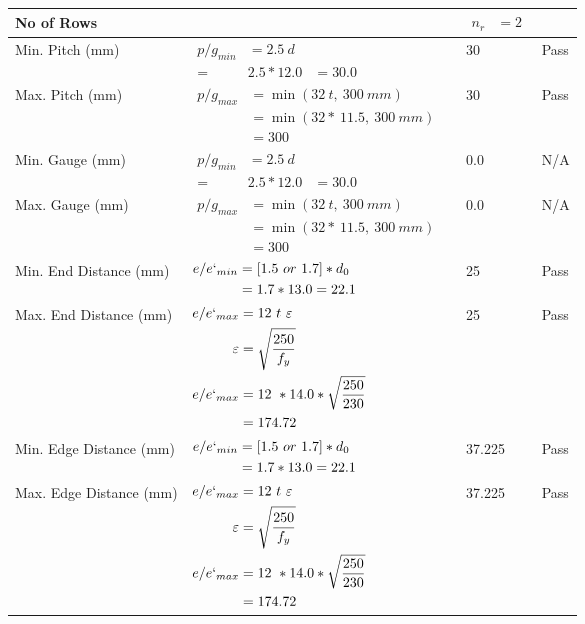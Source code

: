 \documentclass{article}%
\begin{document}
\begin{longtable}{|p{4cm}|p{5cm}|p{5.5cm}|p{1.5cm}|}
\hline%
No of Rows&&$\begin{aligned} n_r &=2 \end{aligned}$&\\%
\hline%
Min. Pitch (mm)&$\begin{aligned}p/g_{min}&= 2.5 ~ d&\\ =&2.5*12.0&=30.0\end{aligned}$&30&Pass\\%
\hline%
Max. Pitch (mm)&$\begin{aligned}p/g_{max} &=\min(32~t,~300~mm)&\\ &=\min(32 *~11.5,~ 300 ~mm)\\&=300\end{aligned}$&30&Pass\\%
\hline%
Min. Gauge (mm)&$\begin{aligned}p/g_{min}&= 2.5 ~ d&\\ =&2.5*12.0&=30.0\end{aligned}$&0.0&N/A\\%
\hline%
Max. Gauge (mm)&$\begin{aligned}p/g_{max} &=\min(32~t,~300~mm)&\\ &=\min(32 *~11.5,~ 300 ~mm)\\&=300\end{aligned}$&0.0&N/A\\%
\hline%
Min. End Distance (mm)&$\begin{aligned}e/e`_{min} &=[1.5~or~ 1.7] * d_0\\ &=1.7*13.0=22.1 \end{aligned}$&25&Pass\\%
\hline%
Max. End Distance (mm)&$\begin{aligned}e/e`_{max} &= 12~ t~ \varepsilon&\\ \varepsilon &= \sqrt{\frac{250}{f_y}}\\ e/e`_{max}&=12 ~*14.0*\sqrt{\frac{250}{230}}\\ &=174.72\\ \end{aligned}$&25&Pass\\%
\hline%
Min. Edge Distance (mm)&$\begin{aligned}e/e`_{min} &=[1.5~or~ 1.7] * d_0\\ &=1.7*13.0=22.1 \end{aligned}$&37.225&Pass\\%
\hline%
Max. Edge Distance (mm)&$\begin{aligned}e/e`_{max} &= 12~ t~ \varepsilon&\\ \varepsilon &= \sqrt{\frac{250}{f_y}}\\ e/e`_{max}&=12 ~*14.0*\sqrt{\frac{250}{230}}\\ &=174.72\\ \end{aligned}$&37.225&Pass\\%

\end{longtable}
\end{document}
